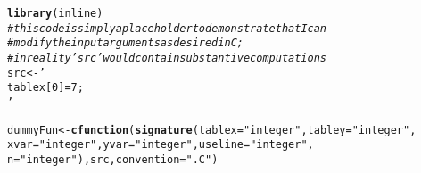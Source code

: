 \documentclass{article}\usepackage[]{graphicx}\usepackage[]{color}
\makeatletter
\newcommand{\hlstr}[1]{\textcolor[rgb]{0.192,0.494,0.8}{#1}}%
\newcommand{\hlcom}[1]{\textcolor[rgb]{0.678,0.584,0.686}{\textit{#1}}}%
\newcommand{\hlstd}[1]{\textcolor[rgb]{0.345,0.345,0.345}{#1}}%
\newcommand{\hlkwb}[1]{\textcolor[rgb]{0.69,0.353,0.396}{#1}}%
\newcommand{\hlkwc}[1]{\textcolor[rgb]{0.333,0.667,0.333}{#1}}%
\newcommand{\hlkwd}[1]{\textcolor[rgb]{0.737,0.353,0.396}{\textbf{#1}}}%
\newenvironment{kframe}{%
 \def\at@end@of@kframe{}%
 \ifinner\ifhmode%
  \def\at@end@of@kframe{\end{minipage}}%
  \begin{minipage}{\columnwidth}%
 \fi\fi%
 \def\FrameCommand##1{\hskip\@totalleftmargin \hskip-\fboxsep
 \colorbox{shadecolor}{##1}\hskip-\fboxsep
     \hskip-\linewidth \hskip-\@totalleftmargin \hskip\columnwidth}%
 \MakeFramed {\advance\hsize-\width
   \@totalleftmargin\z@ \linewidth\hsize
   \@setminipage}}%
 {\par\unskip\endMakeFramed%
 \at@end@of@kframe}
\newenvironment{knitrout}{}{} %
\makeatother
\begin{document}
\begin{knitrout}
\color{fgcolor}\begin{kframe}
\begin{alltt}
\hlkwd{library}\hlstd{(inline)}
\hlcom{# this code is simply a placeholder to demonstrate that I can}
\hlcom{# modify the input arguments as desired in C;}
\hlcom{# in reality 'src' would contain substantive computations}
\hlstd{src} \hlkwb{<-} \hlstr{'
tablex[0] = 7;
'}

\hlstd{dummyFun} \hlkwb{<-} \hlkwd{cfunction}\hlstd{(}\hlkwd{signature}\hlstd{(}\hlkwc{tablex} \hlstd{=} \hlstr{"integer"}\hlstd{,} \hlkwc{tabley} \hlstd{=} \hlstr{"integer"}\hlstd{,}
                                \hlkwc{xvar} \hlstd{=} \hlstr{"integer"}\hlstd{,} \hlkwc{yvar} \hlstd{=} \hlstr{"integer"}\hlstd{,} \hlkwc{useline} \hlstd{=} \hlstr{"integer"}\hlstd{,}
                                \hlkwc{n} \hlstd{=} \hlstr{"integer"}\hlstd{), src,} \hlkwc{convention} \hlstd{=} \hlstr{".C"}\hlstd{)}


\end{alltt}
\end{kframe}
\end{knitrout}
\end{document}
